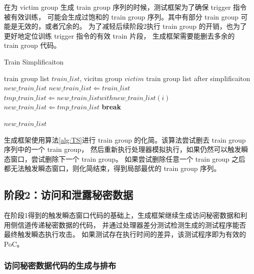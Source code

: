 在为 victim group 生成 train group 序列的时候，测试框架为了确保 trigger 指令被有效训练，
可能会生成过饱和的 train group 序列。其中有部分 train group 可能是无效的，或者冗余的。
为了减轻后续阶段2执行 train group 的开销，也为了更好地定位训练 trigger 指令的有效 train 片段，
生成框架需要能删去多余的 train group 代码。\par

\begin{algorithm}[!h]
    
    
    \caption{Train Simplificaiton}
    \label{alg:TS}
    \renewcommand{\algorithmicrequire}{\textbf{Input:}}
    \renewcommand{\algorithmicensure}{\textbf{Output:}}
    
    \begin{algorithmic}[1]
        \REQUIRE train group list $train\_list$, vicitm group $victim$  %
        \ENSURE train group list after simplificaiton $new\_train\_list$    %
        \STATE $new\_train\_list \Leftarrow train\_list$
                \STATE $tmp\_train\_list \Leftarrow new\_train\_list with new\_train\_list(i)$
                    \STATE $new\_train\_list \Leftarrow tmp\_train\_list$
                    \STATE \textbf{break}
                \ENDIF
            \ENDFOR
        \ENDFOR

        \RETURN $new\_train\_list$
    \end{algorithmic}
\end{algorithm}

生成框架使用算法\ref{alg:TS}进行 train group 的化简。该算法尝试删去 train group 序列中的一个 train group，
然后重新执行处理器模拟执行，如果仍然可以触发瞬态窗口，尝试删除下一个 train group。
如果尝试删除任意一个 train group 之后都无法触发瞬态窗口，则化简结束，得到局部最优的 train group 序列。\par

\subsection{阶段2：访问和泄露秘密数据}

在阶段1得到的触发瞬态窗口代码的基础上，生成框架继续生成访问秘密数据和利用侧信道传递秘密数据的代码，
并通过处理器差分测试检测生成的测试程序能否最终触发瞬态执行攻击。
如果测试存在执行时间的差异，该测试程序即为有效的 PoC。

\subsubsection{访问秘密数据代码的生成与排布}

